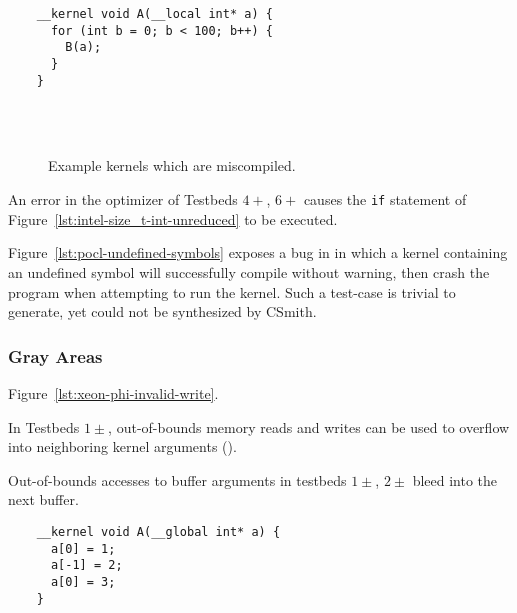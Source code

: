 \newsavebox{\PoclUndefinedSymbols}
\begin{lrbox}{\PoclUndefinedSymbols}
  \hspace{1.5em}
  \begin{lstlisting}
    __kernel void A(__local int* a) {
      for (int b = 0; b < 100; b++) {
        B(a);
      }
    }
  \end{lstlisting}
\end{lrbox}


\begin{figure}
  \centering %
  \\%
  \\%
  \caption{Example kernels which are miscompiled.}%
  \label{lst:wrong-code}%
\end{figure}


An error in the optimizer of Testbeds $4+$, $6+$ causes the \texttt{if} statement of Figure~\ref{lst:intel-size_t-int-unreduced} to be executed.

Figure~\ref{lst:pocl-undefined-symbols} exposes a bug in in which a kernel containing an undefined symbol will successfully compile without warning, then crash the program when attempting to run the kernel. Such a test-case is trivial to generate, yet could not be synthesized by CSmith.


\subsubsection{Gray Areas}

Figure~\ref{lst:xeon-phi-invalid-write}.

In Testbeds $1\pm$, out-of-bounds memory reads and writes can be used to overflow into neighboring kernel arguments ().

Out-of-bounds accesses to buffer arguments in testbeds $1\pm$, $2\pm$ bleed into the next buffer.


\newsavebox{\XeonPhiInvalidWrite}
\begin{lrbox}{\XeonPhiInvalidWrite}
  \hspace{1.5em}
  \begin{lstlisting}
    __kernel void A(__global int* a) {
      a[0] = 1;
      a[-1] = 2;
      a[0] = 3;
    }
  \end{lstlisting}
\end{lrbox}

